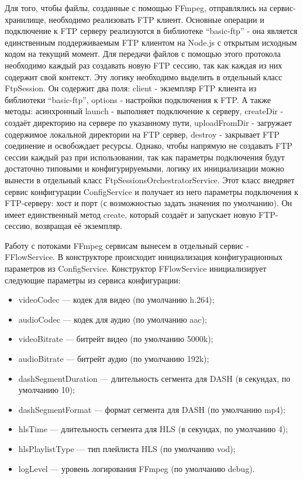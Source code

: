 	Для того, чтобы файлы, созданные с помощью FFmpeg, отправлялись на сервис-хранилище, необходимо реализовать FTP клиент. Основные операции и подключение к FTP серверу реализуются в библиотеке “basic-ftp” - она является единственным поддерживаемым FTP клиентом на Node.js с открытым исходным кодом на текущий момент. Для передачи файлов с помощью этого протокола необходимо каждый раз создавать новую FTP сессию, так как каждая из них содержит свой контекст. Эту логику необходимо выделить в отдельный класс FtpSession. Он содержит два поля: client - экземпляр FTP клиента из библиотеки “basic-ftp”, options - настройки подключения к FTP. А также методы: асинхронный launch - выполняет подключение к серверу, createDir - создаёт директорию на сервере по указанному пути, uploadFromDir - загружает содержимое локальной директории на FTP сервер, destroy - закрывает FTP соединение и освобождает ресурсы. Однако, чтобы напрямую не создавать FTP сессии каждый раз при использовании, так как параметры подключения будут достаточно типовыми и конфигурируемыми, логику их инициализации можно вынести в отдельный класс FtpSessionsOrchestratorService. Этот класс внедряет сервис конфигурации ConfigService и получает из него параметры подключения к FTP-серверу: хост и порт (с возможностью задать значения по умолчанию). Он имеет единственный метод create, который создаёт и запускает новую FTP-сессию, возвращая её экземпляр.

	Работу с потоками FFmpeg сервисам вынесем в отдельный сервис - FFlowService. В конструкторе происходит инициализация конфигурационных параметров из ConfigService. Конструктор FFlowService инициализирует следующие параметры из сервиса конфигурации:

	\begin{itemize}[label=$\bullet$]
		\item videoCodec — кодек для видео (по умолчанию h.264);
		\item audioCodec — кодек для аудио (по умолчанию aac);
		\item videoBitrate — битрейт видео (по умолчанию 5000k);
		\item audioBitrate — битрейт аудио (по умолчанию 192k);
		\item dashSegmentDuration — длительность сегмента для DASH (в секундах, по умолчанию 10);
		\item dashSegmentFormat — формат сегмента для DASH (по умолчанию mp4);
		\item hlsTime — длительность сегмента для HLS (в секундах, по умолчанию 4);
		\item hlsPlaylistType — тип плейлиста HLS (по умолчанию vod);
		\item logLevel — уровень логирования FFmpeg (по умолчанию debug).
	\end{itemize}

